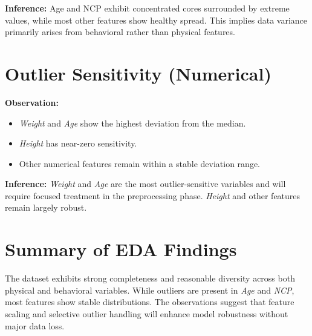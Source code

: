 \textbf{Inference:}
Age and NCP exhibit concentrated cores surrounded by extreme values, while most other features show healthy spread.
This implies data variance primarily arises from behavioral rather than physical features.



\section{Outlier Sensitivity (Numerical)}\label{sec:outlier-sensitivity-(numerical)}

\textbf{Observation:}
\begin{itemize}
    \item \textit{Weight} and \textit{Age} show the highest deviation from the median.
    \item \textit{Height} has near-zero sensitivity.
    \item Other numerical features remain within a stable deviation range.
\end{itemize}

\textbf{Inference:}
\textit{Weight} and \textit{Age} are the most outlier-sensitive variables and will require focused treatment in the preprocessing phase.
\textit{Height} and other features remain largely robust.



\section*{Summary of EDA Findings}
The dataset exhibits strong completeness and reasonable diversity across both physical and behavioral variables.
While outliers are present in \textit{Age} and \textit{NCP}, most features show stable distributions.
The observations suggest that feature scaling and selective outlier handling will enhance model robustness without major data loss.

